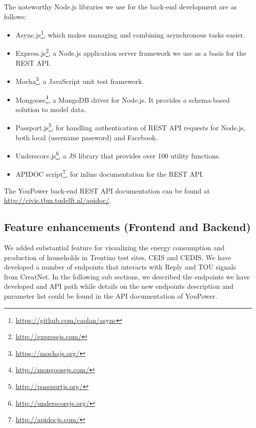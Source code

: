 The noteworthy Node.js libraries we use for the back-end development are as follows:

\begin{itemize}

\item Async.js\footnote{\url{https://github.com/caolan/async}}, which makes managing and combining asynchronous tasks easier. 

\item Express.js\footnote{\url{http://expressjs.com/}}, a Node.js application server framework we use as a basis for the REST API. 

\item Mocha\footnote{\url{https://mochajs.org/}}, a JavaScript unit test framework. 

\item Mongoose\footnote{\url{http://mongoosejs.com/}}, a MongoDB driver for Node.js. It provides a schema-based solution to model data. 

\item Passport.js\footnote{\url{http://passportjs.org/}}, for handling authentication of REST API requests for Node.js, both local (username password) and Facebook. 

\item Underscore.js\footnote{\url{http://underscorejs.org/}}, a JS library that provides over 100 utility functions. 

\item APIDOC script\footnote{\url{http://apidocjs.com/}}, for inline documentation for the REST API. 
\end{itemize}

The YouPower back-end REST API documentation can be found at {\footnotesize\url{http://civis.tbm.tudelft.nl/apidoc/}}. 
% 


\subsection{Feature enhancements (Frontend and Backend)}
We added substantial feature for visualizing the energy consumption and production of households in Trentino test sites, CEIS and CEDIS. We have developed a number of endpoints that interacts with Reply and  TOU signals from CreatNet. In the following sub sections, we described the endpoints we have developed and API path while details on the new endpoints description and parameter list could be found in the API documentation of YouPower.

